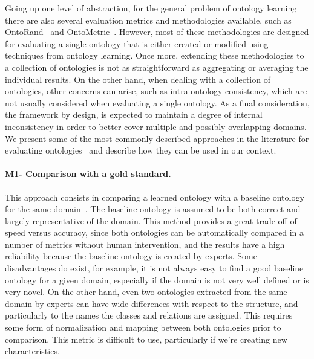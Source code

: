 	Going up one level of abstraction, for the general problem of ontology learning there are also several evaluation metrics and methodologies available, such as OntoRand~\cite{ontorand} and OntoMetric~\cite{ontometric}. 
  However, most of these methodologies are designed for evaluating a single ontology that is either created or modified using techniques from ontology learning. 
  Once more, extending these methodologies to a collection of ontologies is not as straightforward as aggregating or averaging the individual results. 
  On the other hand, when dealing with a collection of ontologies, other concerns can arise, such as intra-ontology consistency, which are not usually considered when evaluating a single ontology. 
  As a final consideration, the framework by design, is expected to maintain a degree of internal inconsistency in order to better cover multiple and possibly overlapping domains.
  We present some of the most commonly described approaches in the literature for evaluating ontologies~\cite{petasis2011ontology} and describe how they can be used in our context.

    \paragraph{M1- Comparison with a gold standard.}
	  This approach consists in comparing a learned ontology with a baseline ontology for the same domain~\cite{corcoglioniti2016frame}. 
    The baseline ontology is assumed to be both correct and largely representative of the domain. 
    This method provides a great trade-off of speed versus accuracy, since both ontologies can be automatically compared in a number of metrics without human intervention, and the results have a high reliability because the baseline ontology is created by experts. 
    Some disadvantages do exist, for example, it is not always easy to find a good baseline ontology for a given domain, especially if the domain is not very well defined or is very novel. 
    On the other hand, even two ontologies extracted from the same domain by experts can have wide differences with respect to the structure, and particularly to the names the classes and relations are assigned. 
    This requires some form of normalization and mapping between both ontologies prior to comparison. 
    This metric is difficult to use, particularly if we're creating new characteristics.

